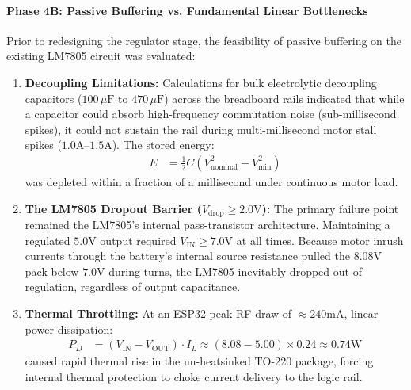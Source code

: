 \documentclass[journal,12pt,onecolumn]{IEEEtran}
\begin{document}
\paragraph*{\textbf{Phase 4B: Passive Buffering vs. Fundamental Linear Bottlenecks}}
Prior to redesigning the regulator stage, the feasibility of passive buffering on the existing LM7805 circuit was evaluated: %
\begin{enumerate}
	\item \textbf{Decoupling Limitations:} Calculations for bulk electrolytic decoupling capacitors ($100\,\mu\text{F}$ to $470\,\mu\text{F}$) across the breadboard rails indicated that while a capacitor could absorb high-frequency commutation noise (sub-millisecond spikes), it could not sustain the rail during multi-millisecond motor stall spikes ($1.0\text{A--}1.5\text{A}$). %
	The stored energy:
	\begin{align}
		E &= \frac{1}{2} C \left(V_{\text{nominal}}^2 - V_{\text{min}}^2\right)
	\end{align}
	was depleted within a fraction of a millisecond under continuous motor load. %
	
	\item \textbf{The LM7805 Dropout Barrier ($V_{\text{drop}} \ge 2.0\text{V}$):} The primary failure point remained the LM7805's internal pass-transistor architecture. %
	Maintaining a regulated $5.0\text{V}$ output required $V_{\text{IN}} \ge 7.0\text{V}$ at all times. %
	Because motor inrush currents through the battery's internal source resistance pulled the $8.08\text{V}$ pack below $7.0\text{V}$ during turns, the LM7805 inevitably dropped out of regulation, regardless of output capacitance. %
	
	\item \textbf{Thermal Throttling:} At an ESP32 peak RF draw of $\approx 240\text{mA}$, linear power dissipation: %
	\begin{align}
		P_D &= (V_{\text{IN}} - V_{\text{OUT}}) \cdot I_L \approx (8.08 - 5.00) \times 0.24 \approx 0.74\text{W}
	\end{align}
	caused rapid thermal rise in the un-heatsinked TO-220 package, forcing internal thermal protection to choke current delivery to the logic rail. %
\end{enumerate}
\end{document}
